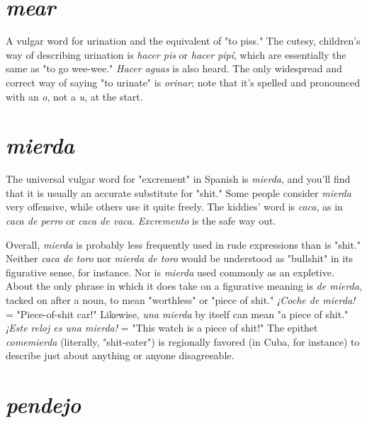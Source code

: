 \section{\emph{mear}}

A vulgar word for urination and the equivalent of "to piss."
The cutesy, children's way of describing urination is \emph{hacer pis} or \emph{hacer
pipí}, which are essentially the same as "to go wee-wee." \emph{Hacer aguas}
is also heard. The only widespread and correct way of saying "to urinate" is \emph{orinar}; note that it's spelled and pronounced with an \emph{o}, not a
\emph{u}, at the start.

\section{\emph{mierda}}

The universal vulgar word for "excrement" in Spanish is
\emph{mierda}, and you'll find that it is usually an accurate substitute for
"shit." Some people consider \emph{mierda} very offensive, while others use it
quite freely. The kiddies' word is \emph{caca}, as in \emph{caca de perro} or \emph{caca de
vaca}. \emph{Excremento} is the safe way out.

Overall, \emph{mierda} is probably less frequently used in rude expressions than is "shit." Neither \emph{caca de toro} nor \emph{mierda de toro}
would be understood as "bullshit" in its figurative sense, for instance.
Nor is \emph{mierda} used commonly as an expletive. About the only phrase
in which it does take on a figurative meaning is \emph{de mierda}, tacked
on after a noun, to mean "worthless" or "piece of shit." \emph{¡Coche de
mierda!} = "Piece-of-shit car!" Likewise, \emph{una mierda} by itself can
mean "a piece of shit." \emph{¡Este reloj es una mierda!} = "This watch is a
piece of shit!" The epithet \emph{comemierda} (literally, "shit-eater") is regionally favored (in Cuba, for instance) to describe just about anything
or anyone disagreeable.

\section{\emph{pendejo}}

